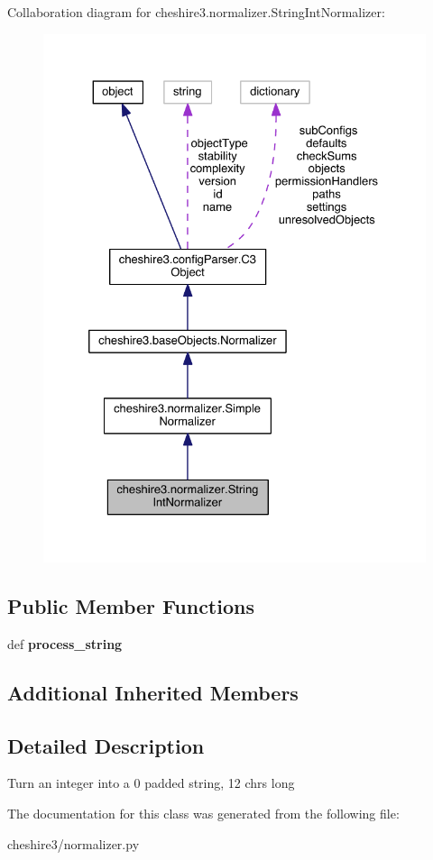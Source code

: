 Collaboration diagram for cheshire3.\-normalizer.\-String\-Int\-Normalizer\-:
\nopagebreak
\begin{figure}[H]
\begin{center}
\leavevmode
\includegraphics[width=328pt]{classcheshire3_1_1normalizer_1_1_string_int_normalizer__coll__graph}
\end{center}
\end{figure}
\subsection*{Public Member Functions}
\begin{DoxyCompactItemize}
\item 
\hypertarget{classcheshire3_1_1normalizer_1_1_string_int_normalizer_ae5f868420edbd6553fbd28e5e715a683}{def {\bfseries process\-\_\-string}}\label{classcheshire3_1_1normalizer_1_1_string_int_normalizer_ae5f868420edbd6553fbd28e5e715a683}

\end{DoxyCompactItemize}
\subsection*{Additional Inherited Members}


\subsection{Detailed Description}
\begin{DoxyVerb}Turn an integer into a 0 padded string, 12 chrs long \end{DoxyVerb}
 

The documentation for this class was generated from the following file\-:\begin{DoxyCompactItemize}
\item 
cheshire3/normalizer.\-py\end{DoxyCompactItemize}
